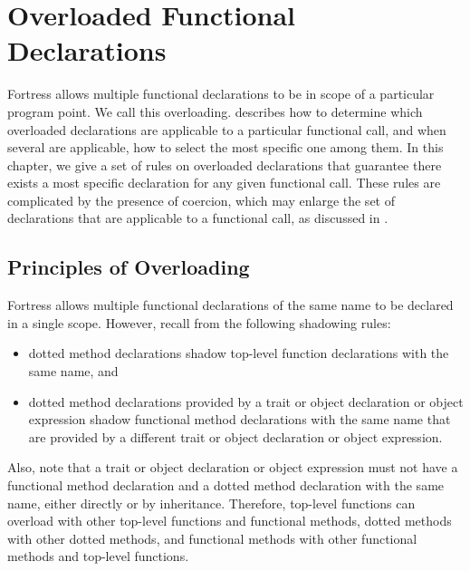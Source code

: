%
%
%
%

\chapter{Overloaded Functional Declarations}



Fortress allows multiple functional declarations to be in scope of a
particular program point.  We call this overloading.
 describes
how to determine which overloaded declarations are
applicable to a particular functional call, and when several
are applicable, how to select the most specific one among them.
In this chapter, we give a
set of rules on overloaded declarations that guarantee there
exists a most specific declaration for any given functional call.
These rules are complicated by the presence of coercion, which may
enlarge the set of declarations that are applicable to a functional
call, as discussed in .



\section{Principles of Overloading}

Fortress allows multiple functional declarations of the same name to
be declared in a single scope.  However, recall from 
the following shadowing rules:
\begin{itemize}
\item
dotted method declarations shadow top-level function declarations with
the same name, and
\item
dotted method declarations provided by a trait or object declaration
or object expression
shadow functional method declarations with the same name that are
provided by a different trait or object declaration
or object expression.
\end{itemize}
Also, note that a trait or object declaration
or object expression must not have a
functional method declaration and a dotted method declaration with the
same name, either directly or by inheritance.
Therefore, top-level functions can overload
with other top-level functions and functional methods, dotted methods with
other dotted methods, and functional methods with other functional methods
and top-level functions.

